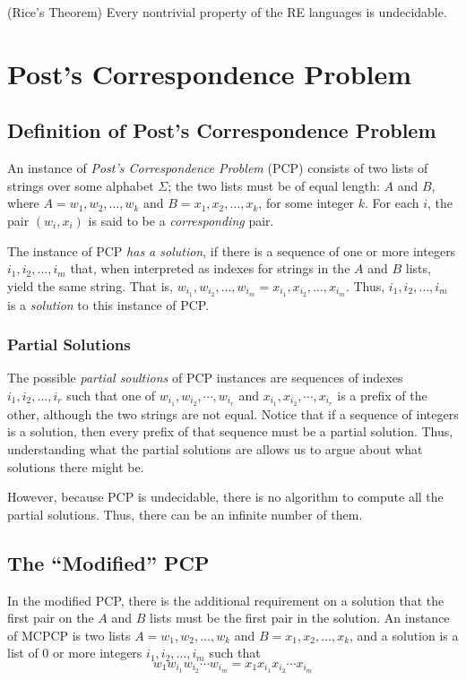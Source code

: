 \documentclass[]{article}
\begin{document}
\begin{thm}
(Rice's Theorem) Every nontrivial property of the RE languages is undecidable.
\end{thm}

\section*{Post's Correspondence Problem}
\subsection*{Definition of Post's Correspondence Problem}
An instance of \emph{Post's Correspondence Problem} (PCP) consists of two lists
of strings over some alphabet $\Sigma$; the two lists must be of equal length:
$A$ and $B$, where $A = w_1, w_2,\ldots,w_k$ and $B = x_1,x_2,\ldots,x_k$, for
some integer $k$. For each $i$, the pair $(w_i,x_i)$ is said to be a
\emph{corresponding} pair.

The instance of PCP \emph{has a solution}, if there is a sequence of one or more
integers $i_1, i_2,\ldots,i_m$ that, when interpreted as indexes for strings in
the $A$ and $B$ lists, yield the same string. That is,
$w_{i_1},w_{i_2},\ldots,w_{i_m} = x_{i_1},x_{i_2},\ldots,x_{i_m}$. Thus,
$i_1,i_2,\ldots,i_m$ is a \emph{solution} to this instance of PCP.

\subsubsection*{Partial Solutions}
The possible \emph{partial soultions} of PCP instances are sequences of indexes
$i_1, i_2, \ldots, i_r$ such that one of $w_{i_1}, w_{i_2}, \cdots, w_{i_r}$ and
$x_{i_1}, x_{i_2}, \cdots, x_{i_r}$ is a prefix of the other, although the two
strings are not equal. Notice that if a sequence of integers is a solution, then
every prefix of that sequence must be a partial solution. Thus, understanding
what the partial solutions are allows us to argue about what solutions there
might be.

However, because PCP is undecidable, there is no algorithm to compute all the
partial solutions. Thus, there can be an infinite number of them.

\subsection*{The ``Modified'' PCP}
In the modified PCP, there is the additional requirement on a solution that the
first pair on the $A$ and $B$ lists must be the first pair in the solution. An
instance of MCPCP is two lists $A = w_1, w_2, \ldots, w_k$ and $B =
x_1,x_2,\ldots,x_k$, and a solution is a list of 0 or more integers
$i_1,i_2,\ldots,i_m$ such that
\[ w_1w_{i_1}w_{i_2}\cdots w_{i_m} = x_1x_{i_1}x_{i_2}\cdots x_{i_m} \]
\end{document}
